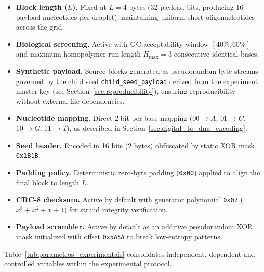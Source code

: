 \begin{itemize}
    \item \textbf{Block length ($L$).} Fixed at $L = 4$ bytes (32 payload bits, producing 16 payload nucleotides per droplet), maintaining uniform short oligonucleotides across the grid.

    \item \textbf{Biological screening.} Active with GC acceptability window $[40\%, 60\%]$ and maximum homopolymer run length $H_{\max} = 3$ consecutive identical bases.

    \item \textbf{Synthetic payload.} Source blocks generated as pseudorandom byte streams governed by the child seed \texttt{child\_seed\_payload} derived from the experiment master key (see Section~\ref{sec:reproducibility}), ensuring reproducibility without external file dependencies.

    \item \textbf{Nucleotide mapping.} Direct 2-bit-per-base mapping ($00 \to A$, $01 \to C$, $10 \to G$, $11 \to T$), as described in Section~\ref{sec:digital_to_dna_encoding}.

    \item \textbf{Seed header.} Encoded in 16 bits (2 bytes) obfuscated by static XOR mask \texttt{0x1B1B}.

    \item \textbf{Padding policy.} Deterministic zero-byte padding (\texttt{0x00}) applied to align the final block to length $L$.

    \item \textbf{CRC-8 checksum.} Active by default with generator polynomial \texttt{0x07} ($x^8 + x^2 + x + 1$) for strand integrity verification.

    \item \textbf{Payload scrambler.} Active by default as an additive pseudorandom XOR mask initialized with offset \texttt{0x5A5A} to break low-entropy patterns.
\end{itemize}

Table~\ref{tab:parametros_experimentais} consolidates independent, dependent and controlled variables within the experimental protocol.

